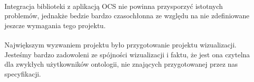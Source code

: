 \paragraph{} Integracja biblioteki z aplikacją OCS nie powinna przysporzyć istotnych problemów, jednakże bedzie bardzo czasochłonna ze względu na nie zdefiniowane jeszcze wymagania tego projektu.
\paragraph{} Największym wyzwaniem projektu było przygotowanie projektu wizualizacji. Jesteśmy bardzo zadowoleni ze spójności wizualizacji i faktu, że jest ona czytelna dla zwykłych użytkowników ontologii, nie znających przygotowanej przez nas specyfikacji.


